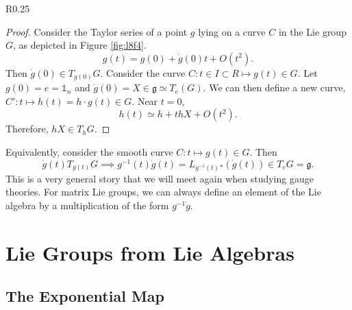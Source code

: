 \begin{wrapfigure}{R}{0.25\columnwidth}
  \centering
  \def\svgwidth{0.2\columnwidth}
  
  \caption{}
  \label{fig:l8f4}
\end{wrapfigure}

\begin{proof}
  Consider the Taylor series of a point $g$ lying on a curve $C$ in the Lie group $G$, as depicted in Figure \ref{fig:l8f4}.
  \begin{equation}
    g(t) = g(0) + \dot g(0) t + O(t^2).
  \end{equation}
  Then $\dot g(0) \in T_{g(0)}G$.
  Consider the curve $C\colon t \in I \subset R \mapsto g(t) \in G$. Let $g(0) = e = \mathbb{1}_n$ and $\dot g(0) = X \in \mathfrak{g} \simeq T_e(G)$.
  We can then define a new curve, $C' \colon t \mapsto h(t) = h \cdot g(t) \in G$. Near $t=0$,
  \begin{equation}
    h(t) \simeq h + t hX + O(t^2).
  \end{equation}
  Therefore, $hX \in T_hG$.
\end{proof}

Equivalently, consider the smooth curve $C \colon t \mapsto g(t) \in G$. Then
\begin{equation}
  \dot g(t) T_{g(t)}G \implies g^{-1}(t) \dot g(t) = L_{g^{-1}(t)}{}_* (\dot g(t)) \in T_eG = \mathfrak{g}.
\end{equation}
This is a very general story that we will meet again when studying gauge theories.
For matrix Lie groups, we can always define an element of the Lie algebra by a multiplication of the form $g^{-1} \dot g$.

\chapter{Lie Groups from Lie Algebras}%
\label{cha:lie_groups_from_lie_algebras}

\section{The Exponential Map}%
\label{sec:the_exponential_map}

